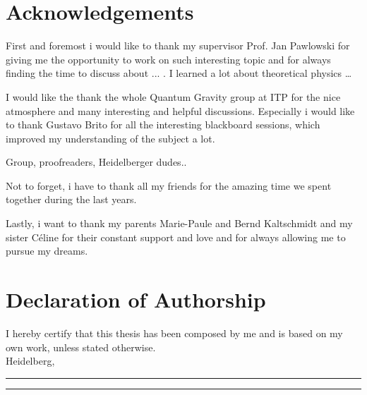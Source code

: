 \thispagestyle{plain}
\section*{Acknowledgements}
First and foremost i would like to thank my supervisor Prof. Jan Pawlowski for giving me the opportunity to work on such interesting topic and for always finding the time to discuss about ... . I learned a lot about theoretical physics \dots

I would like the thank the whole Quantum Gravity group at ITP for the nice atmosphere and many interesting and  helpful discussions. Especially i would like to thank Gustavo Brito for all the interesting blackboard sessions, which improved  my understanding of the subject a lot.  

Group, proofreaders, Heidelberger dudes..


Not to forget, i have to thank all my friends for the amazing time we spent together during the last years. 

Lastly, i want to thank my parents Marie-Paule and Bernd Kaltschmidt and my sister C\'{e}line for their constant support and love and for always allowing me to pursue my dreams.  
 

\section*{Declaration of Authorship}
I hereby certify that this thesis has been composed by me and is based on my own work, unless stated otherwise.\\

Heidelberg, \rule{30mm}{.15mm} \hfill \rule{50mm}{.15mm} \par


